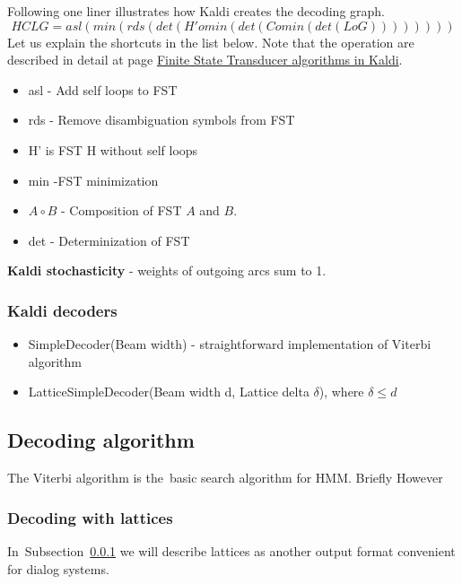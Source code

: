 Following one liner illustrates how Kaldi creates the decoding graph. 
\begin{equation}
   HCLG = asl(min(rds(det(H' o min(det(C o min(det(L o G)))))))) 
\end{equation}
Let us explain the shortcuts in the list below. Note that the operation are described in detail
at page \href{http://kaldi.sourceforge.net/fst_algo.html#fst_algo_stochastic} {Finite State Transducer algorithms in Kaldi}. 
\begin{itemize}
    \item asl - Add self loops to \ac{FST}
    \item rds - Remove disambiguation symbols from \ac{FST}
    \item H' is \ac{FST} H without self loops
    \item min -\ac{FST} minimization
    \item $A\circ B$  - Composition of \ac{FST} $A$ and $B$.
    \item det - Determinization of \ac{FST}
\end{itemize}

{\bf Kaldi stochasticity} - weights of outgoing arcs sum to 1.


\subsubsection*{Kaldi decoders} %
\begin{itemize}
    \item SimpleDecoder(Beam width) - straightforward implementation of Viterbi algorithm
    \item LatticeSimpleDecoder(Beam width d, Lattice delta $\delta$), where $ \delta \le d$

\end{itemize}

\subsection*{Decoding algorithm}
\label{sub:dec_algorithm}
The Viterbi algorithm is the~basic search algorithm for \ac{HMM}. 
Briefly
However


\subsubsection{Decoding with lattices}
\label{sub:lattice}
In~Subsection~\ref{sub:lattice} we will describe lattices as another output format convenient for dialog systems.


